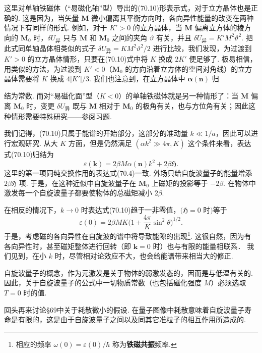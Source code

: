 这里对单轴铁磁体（“易磁化轴”型）导出的(70.10)形表示式，对于立方晶体也是正确的. 这是因为，当矢量 $\bm{M}$ 微小偏离其平衡方向时，各向异性能量的改变在两种情况下有同样的形式. 例如，对于 $K'>0$ 的立方晶体，当 $\bm{M}$ 偏离立方体的棱方向的 $\bm{M}_0$ 时，$\delta U_{\text{异}}$ 只与 $\bm{M}$ 和 $\bm{M}_0$ 之间的夹角 $\vartheta$ 有关，并且 $\delta U_{\text{异}}=K'M^2\vartheta^2$. 把此式同单轴晶体相类似的式子 $\delta U_{\text{异}}=KM^2\vartheta^2/2$ 进行比较，我们发现，为过渡到 $K'>0$ 的立方晶体情形，只要在(70.10)式中将 $K$ 换成 $2K'$ 便足够了. 极易相信，用类似的方法，为过渡到 $K'<0$（$\bm{M}_0$ 的方向沿着立方体的空间对角线）的立方晶体需要将 $K$ 换成 $4|K'|/3$. 我们也注意到，在立方晶体中 $\bm{\alpha}(\bm{n})$ 归

结为常数. 而对“易磁化面”型（$K<0$）的单轴铁磁体就是另一种情形了：当 $\bm{M}$ 偏离 $\bm{M}_0$ 时，变更 $\delta U_{\text{异}}$ 既与 $\bm{M}$ 相对于 $\bm{M}_0$ 的极角有关，也与方位角有关；因此这种情形需要特殊研究——参阅习题.

我们记得，(70.10)只属于能谱的开始部分，这部分的准动量 $k\ll1/a$，因此可以进行宏观研究. 从大 $K$ 方面，但是仍然满足 $(\alpha k^2\gg4\pi,K)$ 这个条件来看，表达式(70.10)归结为
\begin{equation}
\varepsilon(\bm{k})=2\beta M\alpha(\bm{n})k^2+2\beta\mathfrak{H}.
\end{equation}
这里的第一项同纯交换作用的表达式(70.4)一致. 外场只给自旋波量子的能量增添 $2\beta\mathfrak{H}$ 项. 于是，在这种近似中自旋波量子在 $\bm{M}_0$ 上磁矩的投影等于 $-2\beta$. 在物体中激发每一个自旋波量子都要使物体的总磁矩减小 $2\beta$.

在相反的情况下，$k\to0$ 时表达式(70.10)趋于一非零值，$(\mathfrak{H}=0$ 时$)$等于
\begin{equation}
\varepsilon(0)=2\beta MK\biggl(1+\frac{4\pi}{K}\sin^2\theta\biggr)^{1/2}.
\end{equation}
于是，考虑磁的各向异性在自旋波的谱中将导致能隙的出现\footnote{相应的频率 $\omega(0)=\varepsilon(0)/\hbar$ 称为\textbf{铁磁共振}频率.}. 这很自然，因为有各向异性时，甚至磁矩整体进行回转（即 $\bm{k}=0$ 时）也与有限的能量相联系． 我们见到，在小 $k$ 时，尽管相对论效应不大，也会给能谱带来相当大的修正.

自旋波量子的概念，作为元激发是关于物体的弱激发态的，因而是与低温有关的. 因此，关于自旋波量子的公式中一切物质常数（也包括磁化强度 $M$）必须选取 $T=0$ 时的值.

回头再来讨论§69中关于耗散微小的假设. 在量子图像中耗散意味着自旋波量子寿命是有限的，这是由于自旋波量子之间以及同其它准粒子的相互作用所造成的.

